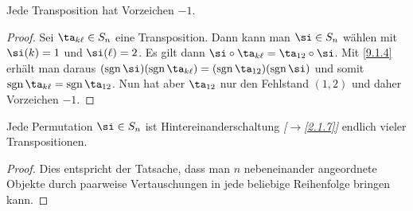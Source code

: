\documentclass[../../main.tex]{subfiles}
\begin{document}
\begin{kor}\label{9.1.5}
Jede Transposition hat Vorzeichen $-1$.
\end{kor}

\begin{proof}
Sei $\ta_{k\ell}\in S_n$ eine Transposition. Dann kann man $\si\in S_n$ wählen mit $\si(k)=1$ und $\si(\ell)=2$. Es gilt dann $\si\circ\ta_{k\ell}=\ta_{12}\circ\si$.
Mit \ref{9.1.4} erhält man daraus $(\sgn\si)(\sgn\ta_{k\ell})=(\sgn\ta_{12})(\sgn\si)$ und somit $\sgn\ta_{k\ell}=\sgn\ta_{12}$. Nun hat aber $\ta_{12}$ nur
den Fehlstand $(1,2)$ und daher Vorzeichen $-1$.
\end{proof}


\begin{lem}\label{9.1.6}
Jede Permutation $\si\in S_n$ ist Hintereinanderschaltung \emph{[$\to$\ref{2.1.7}]} endlich vieler Transpositionen.
\end{lem}

\begin{proof}
Dies entspricht der Tatsache, dass man $n$ nebeneinander angeordnete Objekte durch paarweise Vertauschungen in jede beliebige Reihenfolge bringen kann.
\end{proof}
\end{document}
